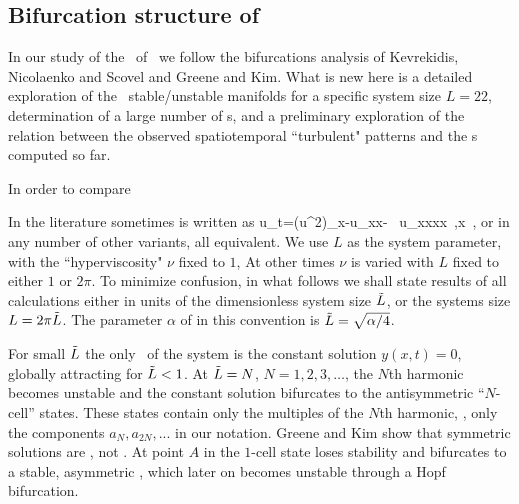 \subsection{Bifurcation structure of \KS}
\label{sec:KSlit}
%

In our study of the \eqva\ of
\KSe\ we follow the bifurcations analysis of
Kevrekidis, Nicolaenko and Scovel 
and
Greene and Kim. What is new here is
a detailed exploration of the \eqva\ stable/unstable manifolds
for a specific system size $L = 22$, determination
of a large number of \rpo s, and a preliminary
exploration of the relation between the
observed spatiotemporal ``turbulent" patterns and
the \rpo s computed so far.



In order to compare 

In the literature sometimes  is written as
\beq
    u_t=(u^2)_x-u_{xx}- \nu \, u_{xxxx}
    \,,\qquad   x \in [0,L]
    \,,
or in any number of other variants, all equivalent.
We use
$L$ as the system parameter, with the ``hyperviscosity" $\nu$ fixed to $1$, 
At other times $\nu$ is varied with $L$ fixed to either $1$ or $2\pi$.
To minimize confusion,
in what follows we shall state results of all 
calculations either in units of the dimensionless system size $\tilde{L}$,
or the systems size $L = 2 \pi \tilde{L}$. The parameter $\alpha$
of  in this convention is
$\tilde{L}=\sqrt{\alpha/4}$.


For small $\tilde{L}$ the only \eqv\ of the system is the constant solution $y(x,t)=0$,
globally attracting 
for $\tilde{L}<1$. At $\tilde{L}=N$, $N=1,2,3, \dots$, 
the $N$th harmonic becomes unstable and the constant solution
bifurcates to the antisymmetric ``$N$-cell'' states. 
These states contain only the multiples of the $N$th
harmonic, {\ie}, only the components $a_N,a_{2N},...$ in our notation.
Greene and Kim show that symmetric solutions are \eqva, not \reqva. 
At point $A$ in 
the $1$-cell state loses stability
and bifurcates to a stable, 
asymmetric \reqv, which later on becomes unstable through a Hopf bifurcation. 

